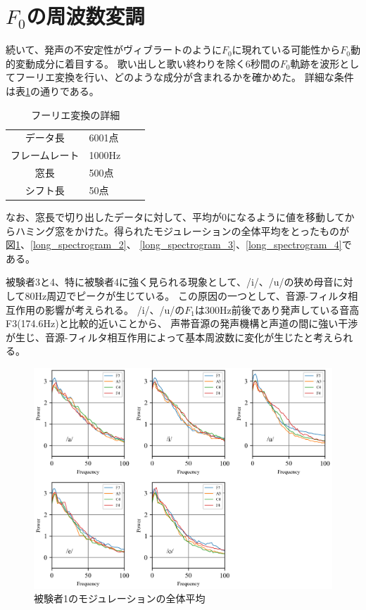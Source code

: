 \documentclass[10.5ptj,a4j,dvipdfmx,uplatex, oneside, openany, report]{jsbook}%
\begin{document}
\section{$F_0$の周波数変調}
続いて、発声の不安定性がヴィブラートのように$F_0$に現れている可能性から$F_0$動的変動成分に着目する。
歌い出しと歌い終わりを除く6秒間の$F_0$軌跡を波形としてフーリエ変換を行い、どのような成分が含まれるかを確かめた。
詳細な条件は表\ref{table:F0Moduration}の通りである。


\begin{table}[h]
    \caption{フーリエ変換の詳細}
    \label{table:F0Moduration}
    \centering
    \begin{tabular}{clll}
        \hline
        データ長 & 6001点\\
        フレームレート & 1000Hz\\
        窓長 & 500点\\
        シフト長 & 50点\\
        \hline
    \end{tabular}
\end{table}


なお、窓長で切り出したデータに対して、平均が0になるように値を移動してからハミング窓をかけた。得られたモジュレーションの全体平均をとったものが
図\ref{long_spectrogram_1}、\ref{long_spectrogram_2}、
\ref{long_spectrogram_3}、\ref{long_spectrogram_4}である。



被験者3と4、特に被験者4に強く見られる現象として、/i/、/u/の狭め母音に対して80Hz周辺でピークが生じている。
この原因の一つとして、音源-フィルタ相互作用の影響が考えられる。
/i/、/u/の$F_1$は300Hz前後であり発声している音高F3(174.6Hz)と比較的近いことから、
声帯音源の発声機構と声道の間に強い干渉が生じ\cite{source-filterCoupling}、音源-フィルタ相互作用によって基本周波数に変化が生じたと考えられる。\cite{tsuburagi}

\begin{figure}[htbp]
    \begin{center}
      \includegraphics[clip,width=12.0cm]{long_spectrogram_1.png}
      \caption{被験者1のモジュレーションの全体平均}
      \label{long_spectrogram_1}
    \end{center}
\end{figure}
\end{document}
